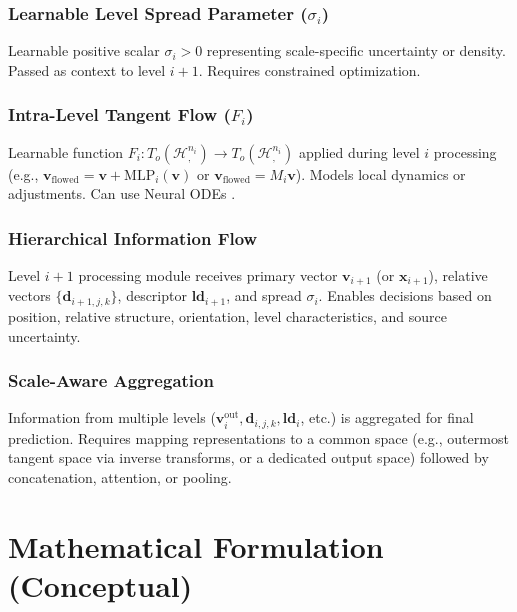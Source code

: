 \documentclass[11pt, twoside]{article} %
\newcommand{\HypSpaceCmd}[3]{\mathcal{H}^{#1}_{#2, #3}} %
\begin{document}
\subsubsection[Learnable Level Spread Parameter (sigma i)]{\texorpdfstring{Learnable Level Spread Parameter ($\sigma_i$)}{Learnable Level Spread Parameter (sigma i)}}
\label{ssubsec:level_spread}
Learnable positive scalar $\sigma_i > 0$ representing scale-specific uncertainty or density. Passed as context to level $i+1$. Requires constrained optimization.

\subsubsection[Intra-Level Tangent Flow (Fi)]{\texorpdfstring{Intra-Level Tangent Flow ($F_i$)}{Intra-Level Tangent Flow (Fi)}}
\label{ssubsec:tangent_flow}
Learnable function $F_i: T_o(\HypSpaceCmd{n_i}{}{}) \rightarrow T_o(\HypSpaceCmd{n_i}{}{})$ applied during level $i$ processing (e.g., $\mathbf{v}_{\text{flowed}} = \mathbf{v} + \text{MLP}_i(\mathbf{v})$ or $\mathbf{v}_{\text{flowed}} = M_i \mathbf{v}$). Models local dynamics or adjustments. Can use Neural ODEs \cite{ChenEtAl2018}.

\subsubsection{Hierarchical Information Flow}
\label{ssubsec:info_flow}
Level $i+1$ processing module receives primary vector $\mathbf{v}_{i+1}$ (or $\mathbf{x}_{i+1}$), relative vectors $\{\mathbf{d}_{i+1, j, k}\}$, descriptor $\mathbf{ld}_{i+1}$, and spread $\sigma_i$. Enables decisions based on position, relative structure, orientation, level characteristics, and source uncertainty.

\subsubsection{Scale-Aware Aggregation}
\label{ssubsec:aggregation}
Information from multiple levels ($\mathbf{v}_i^{\text{out}}, \mathbf{d}_{i,j,k}, \mathbf{ld}_i$, etc.) is aggregated for final prediction. Requires mapping representations to a common space (e.g., outermost tangent space via inverse transforms, or a dedicated output space) followed by concatenation, attention, or pooling.

\section{Mathematical Formulation (Conceptual)}
\label{sec:math_formulation}
\end{document}

